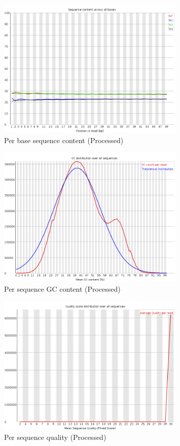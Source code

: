 \documentclass[UTF8]{ctexart}
\begin{document}
\begin{figure}[!htb]
	\centering
	\includegraphics[width=0.8\textwidth]{img/SRR14325859_FastQC_Processed_img/per_base_sequence_content.png}	
	\caption{Per base sequence content (Processed)\protect}    
\end{figure}

\begin{figure}[!htb]
	\centering
	\includegraphics[width=0.8\textwidth]{img/SRR14325859_FastQC_Processed_img/per_sequence_gc_content.png}	
	\caption{Per sequence GC content (Processed)\protect}    
\end{figure}

\begin{figure}[!htb]
	\centering
	\includegraphics[width=0.8\textwidth]{img/SRR14325859_FastQC_Processed_img/per_sequence_quality.png}	
	\caption{Per sequence quality (Processed)\protect}    
\end{figure}
\end{document}
